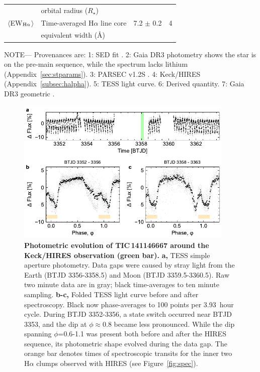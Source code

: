 \documentclass[11pt,twocolumn,tighten]{aastex7}
\begin{document}
\begin{table}
\begin{tabular}{llcc}
                                        & \hspace{3pt} orbital radius ($R_\star$)	                       &                      \\
%
$\langle$EW$_{\rm H\alpha}$$\rangle$    & Time-averaged H$\alpha$ line core                              &  7.2 $\pm$ 0.2   & 4 \\ 
                                        & \hspace{3pt} equivalent width (\AA)	                           &                      \\
\hline
\end{tabular}
\begin{flushleft}
\footnotesize{ \textsc{NOTE}---
Provenances are:
1: SED fit \citep{Bouma2024}.
2: Gaia DR3 photometry shows the star is on the pre-main sequence,
   while the spectrum lacks lithium (Appendix~\ref{sec:stparams}).
3: PARSEC v1.2S \citep{Chen2014}.
4: Keck/HIRES (Appendix~\ref{subsec:halpha}).
5: TESS light curve.
6: Derived quantity.
7: Gaia DR3 geometric \citep{GaiaDR3}.
}
\end{flushleft}
\vspace{-0.5cm}
\end{table}

\begin{figure}[!t]
  \centering
  \includegraphics[width=0.925\textwidth]{f2.pdf}
  \vspace{-0.2cm}
  \caption{{\bf Photometric evolution of TIC\,141146667 around the Keck/HIRES
  observation (green bar).}  {\bf a,} TESS simple aperture photometry.
  Data gaps were caused by stray light from the Earth (BTJD 3356-3358.5) and
  Moon (BTJD 3359.5-3360.5).  Raw two minute data are in gray; black
  time-averages to ten minute sampling.  {\bf b-c,} Folded TESS light
  curve before and after spectroscopy.  Black now phase-averages to
  100 points per 3.93\ hour cycle.  During BTJD 3352-3356, a state
  switch occurred near BTJD 3353, and the dip at $\phi$$\approx$0.8
  became less pronounced.  While the dip spanning
  $\phi$=0.6-1.1 was present both before and after the HIRES
  sequence, its photometric shape evolved during the data gap.  The
  orange bar denotes times of spectroscopic transits for the inner two
  H$\alpha$ clumps observed with HIRES (see Figure~\ref{fig:spec}).}
  \label{fig:fulllc}
\end{figure}
\end{document}
